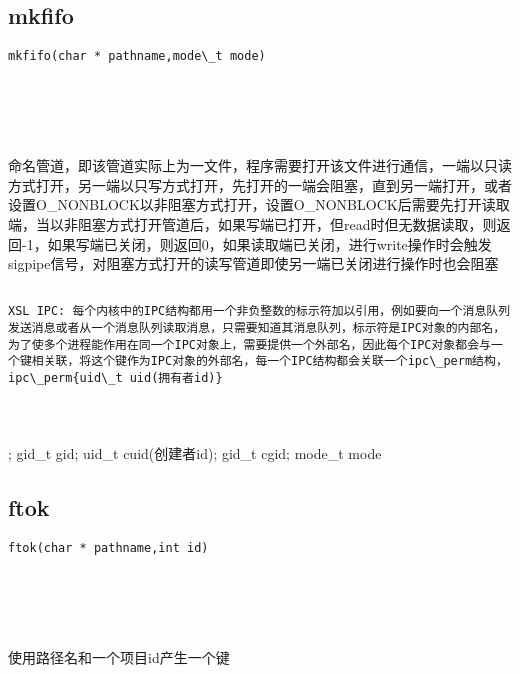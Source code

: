 \documentclass[10pt,a4paper]{article}
\begin{document}
\subsection{mkfifo}
\begin{spacing}{2.0}
\lstset{language=C,numbers=none}
\begin{lstlisting}
mkfifo(char * pathname,mode\_t mode)
\end{lstlisting}
{\large\color[rgb]{0.2,0.4,0.6}{pathname:}} \\
{\large\color[rgb]{0.2,0.4,0.6}{mode:}}
\paragraph{ \ \ } 命名管道，即该管道实际上为一文件，程序需要打开该文件进行通信，一端以只读方式打开，另一端以只写方式打开，先打开的一端会阻塞，直到另一端打开，或者设置O\_NONBLOCK以非阻塞方式打开，设置O\_NONBLOCK后需要先打开读取端，当以非阻塞方式打开管道后，如果写端已打开，但read时但无数据读取，则返回-1，如果写端已关闭，则返回0，如果读取端已关闭，进行write操作时会触发sigpipe信号，对阻塞方式打开的读写管道即使另一端已关闭进行操作时也会阻塞
\end{spacing}

\subsection{}
\begin{spacing}{2.0}
\lstset{language=C,numbers=none}
\begin{lstlisting}
XSL IPC: 每个内核中的IPC结构都用一个非负整数的标示符加以引用，例如要向一个消息队列发送消息或者从一个消息队列读取消息，只需要知道其消息队列，标示符是IPC对象的内部名，为了使多个进程能作用在同一个IPC对象上，需要提供一个外部名，因此每个IPC对象都会与一个键相关联，将这个键作为IPC对象的外部名，每一个IPC结构都会关联一个ipc\_perm结构，ipc\_perm{uid\_t uid(拥有者id)}
\end{lstlisting}
{\large\color[rgb]{0.2,0.4,0.6}{uid(拥有者id:}}
\paragraph{ \ \ }; gid\_t gid; uid\_t cuid(创建者id); gid\_t cgid; mode\_t mode
\end{spacing}

\subsection{ftok}
\begin{spacing}{2.0}
\lstset{language=C,numbers=none}
\begin{lstlisting}
ftok(char * pathname,int id)
\end{lstlisting}
{\large\color[rgb]{0.2,0.4,0.6}{pathname:}} \\
{\large\color[rgb]{0.2,0.4,0.6}{id:}}
\paragraph{ \ \ }使用路径名和一个项目id产生一个键
\end{spacing}
\end{document}

